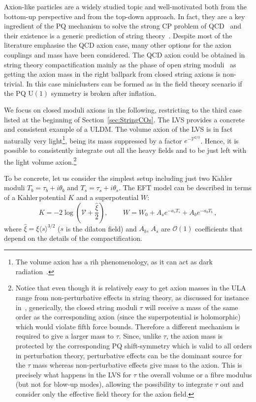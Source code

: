\documentclass[11pt,a4paper]{article}
\newcommand{\V}{\mathcal{V}}
\newcommand{\Kahler}{\ensuremath{\text{K}\ddot{\text{a}}\text{hler}\,}}
\begin{document}
Axion-like particles are a widely studied topic and well-motivated both from the bottom-up perspective and from the top-down approach. In fact, they are a key ingredient of the PQ mechanism to solve the strong CP problem of QCD~\cite{Peccei:1977hh, Wilczek:1977pj, Weinberg:1977ma} and their existence is a generic prediction of string theory~\cite{Conlon:2006tq,Svrcek:2006yi,Arvanitaki:2009fg}. Despite most of the literature emphasise the QCD axion case, many other options for the axion couplings and mass have been considered. The QCD axion could be obtained in string theory compactification mainly as the phase of open string moduli~\cite{Cicoli:2012sz} as getting the axion mass in the right ballpark from closed string axions is non-trivial. In this case miniclusters can be formed as in the field theory scenario if the PQ U$(1)$ symmetry is broken after inflation.


We focus on closed moduli axions in the following, restricting to the third case listed at the beginning of Section~\ref{sec:StringCOs}. The LVS provides a concrete and consistent example of a ULDM. The volume axion of the LVS is in fact naturally very light\footnote{The volume axion has a rih phenomenology, as it can act as dark radiation~\cite{Cicoli:2012aq, Higaki:2012ar, Cicoli:2015bpq}.}, being its mass suppressed by a factor $e^{-\V^{2/3}}$. Hence, it is possible to consistently integrate out all the heavy fields and to be just left with the light volume axion.\footnote{Notice that even though it is relatively easy to get axion masses in the ULA range from non-perturbative effects in string theory, as discussed for instance in~\cite{Hui:2016ltb}, generically, the closed string moduli $\tau$ will receive a mass of the same order as the corresponding axion (since the superpotential is holomorphic) which would violate fifth force bounds. Therefore a different mechanism is required to give a larger mass to $\tau$. Since, unlike $\tau$, the axion mass is protected by the corresponding PQ shift-symmetry which is valid to all orders in perturbation theory, perturbative effects can be the dominant source for the $\tau$ mass whereas non-perturbative effects give mass to the axion. This is precisely what happens in the LVS for $\tau$ the overall volume or a fibre modulus (but not for blow-up modes), allowing the possibility to integrate $\tau$ out and consider only the effective field theory for the axion field.}

To be concrete, let us consider the simplest setup including just two \Kahler moduli $T_b = \tau_b + i \theta_b$ and $T_s = \tau_s + i \theta_s$. The EFT model can be described in terms of a \Kahler potential $K$ and a superpotential $W$:
\begin{equation}
K = - 2 \log\left(\V + \frac{\hat{\xi}}{2}\right), \, \qquad W = W_0 + A_s e^{- a_s T_s} + A_b e^{- a_b T_b}\,,
\end{equation}
where $\hat{\xi} = \xi \langle s\rangle^{3/2}$ ($s$ is the dilaton field) and $A_b$, $A_s$ are $\mathcal{O}(1)$ coefficients that depend on the details of the compactification.
\end{document}
